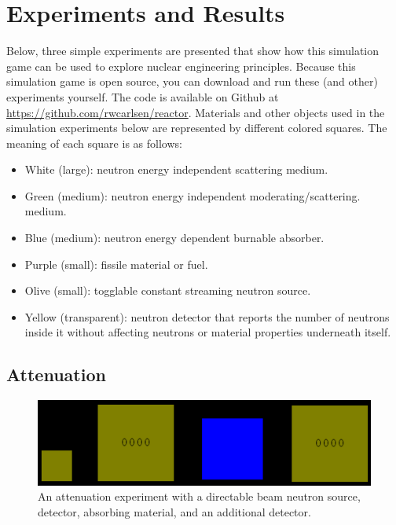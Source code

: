 \documentclass{anstrans}
\begin{document}
\section{Experiments and Results}

Below, three simple experiments are presented that show how this simulation
game can be used to explore nuclear engineering principles.  Because this
simulation game is open source, you can download and run these (and other)
experiments yourself.  The code is available on Github at
\url{https://github.com/rwcarlsen/reactor}.  Materials and other objects used
in the simulation experiments below are represented by different colored
squares.  The meaning of each square is as follows:

\begin{itemize}
        
    \item White (large): neutron energy independent scattering medium.

    \item Green (medium): neutron energy independent moderating/scattering.
        medium.

    \item Blue (medium): neutron energy dependent burnable absorber.

    \item Purple (small): fissile material or fuel.

    \item Olive (small): togglable constant streaming neutron source.

    \item Yellow (transparent): neutron detector that reports the number of
        neutrons inside it without affecting neutrons or material properties
        underneath itself.

\end{itemize}


\subsection{Attenuation}

\begin{figure}
    \centering
    \includegraphics[width=\columnwidth]{atten-setup.png}
    \caption{An attenuation experiment with a directable beam neutron source,
      detector, absorbing material, and an additional detector.}
    \label{fig:atten-setup}
\end{figure}
\end{document}
